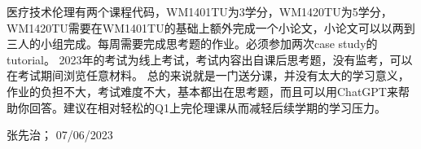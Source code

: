 医疗技术伦理有两个课程代码，WM1401TU为3学分，WM1420TU为5学分，WM1420TU需要在WM1401TU的基础上额外完成一个小论文，小论文可以以两到三人的小组完成。每周需要完成思考题的作业。必须参加两次case study的tutorial。
2023年的考试为线上考试，考试内容出自课后思考题，没有监考，可以在考试期间浏览任意材料。
总的来说就是一门送分课，并没有太大的学习意义，作业的负担不大，考试难度不大，基本都出在思考题，而且可以用ChatGPT来帮助你回答。建议在相对轻松的Q1上完伦理课从而减轻后续学期的学习压力。

\begin{flushright}
张先治； 07/06/2023
\end{flushright}

